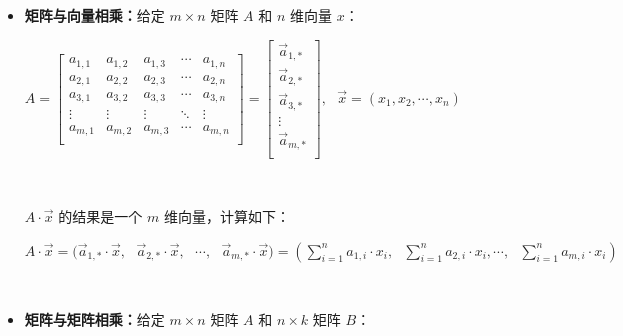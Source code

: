 \begin{tcolorbox}[title={\textbf{\tboxdef{\ref*{subsec:matrix-arithmetic}} 矩阵运算}}]

\begin{itemize}
\item \textbf{矩阵与向量相乘：}给定 $m \times n$ 矩阵 $A$ 和 $n$ 维向量 $x$：


$A = \begin{bmatrix}
 a_{1, 1} & a_{1, 2} & a_{1, 3} & \cdots & a_{1, n}\\
 a_{2, 1} & a_{2, 2} & a_{2, 3} & \cdots & a_{2, n} \\
 a_{3, 1} & a_{3, 2} & a_{3, 3} & \cdots & a_{3, n} \\
\vdots & \vdots & \vdots & \ddots & \vdots \\
 a_{m, 1} & a_{m, 2} & a_{m, 3} & \cdots & a_{m, n} \\
\end{bmatrix} = \begin{bmatrix} 
\vec{a}_{1, * } \\ 
\vec{a}_{2, * } \\ 
\vec{a}_{3, * } \\ 
\vdots\\
\vec{a}_{m, * } \\ 
\end{bmatrix}, \text{ } \vec{x} = (x_1, x_2, \cdots, x_{n})$


$ $

$A \cdot \vec{x}$ 的结果是一个 $m$ 维向量，计算如下：

$A \cdot \vec{x} = \Big(\vec{a}_{1, * } \cdot \vec{x}, \text{ } \vec{a}_{2, * } \cdot \vec{x}, \text{ }\cdots,\text{ } \vec{a}_{m, * } \cdot \vec{x} \Big) = \left(\sum\limits_{i=1}^{n} a_{1, i} \cdot  x_i, \text{ } \sum\limits_{i=1}^{n}  a_{2, i} \cdot x_i,\cdots, \text{ } \sum\limits_{i=1}^{n} a_{m, i} \cdot x_i \right)$


$ $


\item \textbf{矩阵与矩阵相乘：}给定 $m \times n$ 矩阵 $A$ 和 $n \times k$ 矩阵 $B$：




\end{itemize}
\end{tcolorbox}
